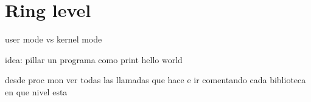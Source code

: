 \section{Ring level}

user mode vs kernel mode

idea: pillar un programa como print hello world

desde proc mon ver todas las llamadas que hace e ir comentando cada biblioteca en que nivel esta